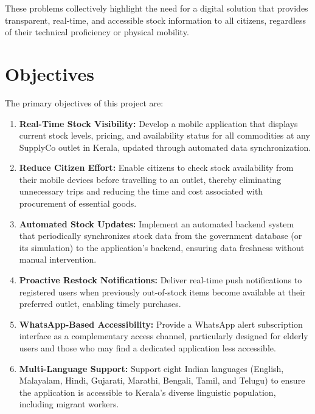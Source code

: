 These problems collectively highlight the need for a digital solution that provides transparent, real-time, and accessible stock information to all citizens, regardless of their technical proficiency or physical mobility.

\section{Objectives}

The primary objectives of this project are:

\begin{enumerate}[label=\arabic*.]
    \item \textbf{Real-Time Stock Visibility:} Develop a mobile application that displays current stock levels, pricing, and availability status for all commodities at any SupplyCo outlet in Kerala, updated through automated data synchronization.

    \item \textbf{Reduce Citizen Effort:} Enable citizens to check stock availability from their mobile devices before travelling to an outlet, thereby eliminating unnecessary trips and reducing the time and cost associated with procurement of essential goods.

    \item \textbf{Automated Stock Updates:} Implement an automated backend system that periodically synchronizes stock data from the government database (or its simulation) to the application's backend, ensuring data freshness without manual intervention.

    \item \textbf{Proactive Restock Notifications:} Deliver real-time push notifications to registered users when previously out-of-stock items become available at their preferred outlet, enabling timely purchases.

    \item \textbf{WhatsApp-Based Accessibility:} Provide a WhatsApp alert subscription interface as a complementary access channel, particularly designed for elderly users and those who may find a dedicated application less accessible.

    \item \textbf{Multi-Language Support:} Support eight Indian languages (English, Malayalam, Hindi, Gujarati, Marathi, Bengali, Tamil, and Telugu) to ensure the application is accessible to Kerala's diverse linguistic population, including migrant workers.


\end{enumerate}
